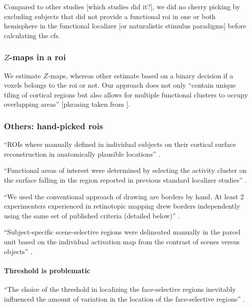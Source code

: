 %
Compared to other studies [which studies did it?], we did no cherry picking by
excluding subjects that did not provide a functional \ac{roi} in one or both
hemisphere in the functional localizer [or naturalistic stimulus paradigms]
before calculating the \ac{cfs}.


\subsubsection{$Z$-maps in a \ac{roi}}




%
We estimate $Z$-maps, whereas other estimate based on a binary decision if a
voxels belongs to the \ac{roi} or not.
%
Our approach does not only ``contain unique tiling of cortical regions
but also allows for multiple functional clusters to occupy overlapping
areas'' [phrasing taken from \citet{rosenke2021probabilistic}].


\subsubsection{Others: hand-picked \acp{roi}}

%
``ROIs where manually defined in individual subjects on their cortical surface
reconstruction in anatomically plausible locations''
\citep{rosenke2021probabilistic}.

%
``Functional areas of interest were determined by selecting the activity cluster
on the surface falling in the region reported in previous standard localizer
studies'' \citep{frost2012measuring}.

%
``We used the conventional approach of drawing are borders by hand.
%
At least 2 experimenters experienced in retinotopic mapping drew borders
independently using the same set of published criteria (detailed below)''
\citep{wang2015probabilistic}.

%
``Subject-specific scene-selective regions were delineated manually in the
parcel unit based on the individual activation map from the contrast of scenes
versus objects'' \citep{zhen2017quantifying}.


\paragraph{Threshold is problematic}

%
``The choice of the threshold in localizing the face-selective regions
inevitably influenced the amount of variation in the location of the
face-selective regions'' \citep{zhen2015quantifying}.

